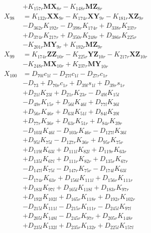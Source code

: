 \begin{multicols}{2}
\begin{align}
&+ K_{157r}\mathbf{MX}_{8r} - K_{148r}\mathbf{MZ}_{8r} \nonumber \\
X_{98} &= K_{132r}\mathbf{XX}_{9r} - K_{174r}\mathbf{XY}_{9r} - K_{181r}\mathbf{XZ}_{9r}  \nonumber \\
&- D_{362r}K_{192r} - D_{398r}K_{174r} + D_{338r}K_{237r}  \nonumber \\
&+ D_{374r}K_{217r} + D_{350r}K_{248r} + D_{386r}K_{225r}  \nonumber \\
&- K_{201r}\mathbf{MY}_{9r} + K_{192r}\mathbf{MZ}_{9r} \nonumber \\
X_{99} &= K_{174r}\mathbf{ZZ}_{10r} - K_{225r}\mathbf{YZ}_{10r} - K_{217r}\mathbf{XZ}_{10r}  \nonumber \\
&- K_{248r}\mathbf{MX}_{10r} + K_{237r}\mathbf{MY}_{10r} \nonumber \\
X_{100} &= D_{70l}c_{1l} - D_{27l}c_{1l} - D_{27r}c_{1r}  \nonumber \\
&- D_{73} + D_{70r}c_{1r} + D_{39l}s_{1l} + D_{39r}s_{1r}  \nonumber \\
&+ D_{21l}K_{23l} + D_{21r}K_{23r} - D_{49l}K_{15l}  \nonumber \\
&- D_{49r}K_{15r} + D_{56l}K_{46l} + D_{77l}K_{36l}  \nonumber \\
&+ D_{56r}K_{46r} + D_{63l}K_{51l} + D_{84l}K_{39l}  \nonumber \\
&+ D_{77r}K_{36r} + D_{63r}K_{51r} + D_{84r}K_{39r}  \nonumber \\
&- D_{103l}K_{46l} - D_{103r}K_{46r} - D_{127l}K_{36l}  \nonumber \\
&+ D_{95l}K_{75l} - D_{127r}K_{36r} + D_{95r}K_{75r}  \nonumber \\
&+ D_{119l}K_{63l} + D_{111l}K_{82l} + D_{119r}K_{63r}  \nonumber \\
&+ D_{135l}K_{67l} + D_{111r}K_{82r} + D_{135r}K_{67r}  \nonumber \\
&- D_{147l}K_{75l} - D_{147r}K_{75r} - D_{174l}K_{63l}  \nonumber \\
&- D_{174r}K_{63r} + D_{156l}K_{111l} + D_{156r}K_{111r}  \nonumber \\
&+ D_{183l}K_{97l} + D_{165l}K_{118l} + D_{183r}K_{97r}  \nonumber \\
&+ D_{192l}K_{102l} + D_{165r}K_{118r} + D_{192r}K_{102r}  \nonumber \\
&- D_{215l}K_{111l} - D_{215r}K_{111r} - D_{245l}K_{97l}  \nonumber \\
&+ D_{205l}K_{148l} - D_{245r}K_{97r} + D_{205r}K_{148r}  \nonumber \\
&+ D_{235l}K_{132l} + D_{235r}K_{132r} + D_{225l}K_{157l}  \nonumber \\

\end{align}
\end{multicols}
